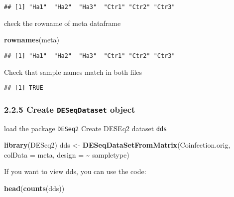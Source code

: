 \documentclass[
]{article}
\newenvironment{Shaded}{\begin{snugshade}}{\end{snugshade}}
\newcommand{\AttributeTok}[1]{\textcolor[rgb]{0.13,0.29,0.53}{#1}}
\newcommand{\FunctionTok}[1]{\textcolor[rgb]{0.13,0.29,0.53}{\textbf{#1}}}
\newcommand{\NormalTok}[1]{#1}
\newcommand{\OtherTok}[1]{\textcolor[rgb]{0.56,0.35,0.01}{#1}}
\newcommand{\SpecialCharTok}[1]{\textcolor[rgb]{0.81,0.36,0.00}{\textbf{#1}}}
\begin{document}
\begin{verbatim}
## [1] "Ha1"  "Ha2"  "Ha3"  "Ctr1" "Ctr2" "Ctr3"
\end{verbatim}

check the rowname of meta dataframe

\begin{Shaded}
\begin{Highlighting}[]
\FunctionTok{rownames}\NormalTok{(meta)}
\end{Highlighting}
\end{Shaded}

\begin{verbatim}
## [1] "Ha1"  "Ha2"  "Ha3"  "Ctr1" "Ctr2" "Ctr3"
\end{verbatim}

Check that sample names match in both files

\begin{Shaded}
\end{Shaded}

\begin{verbatim}
## [1] TRUE
\end{verbatim}

\subsubsection{\texorpdfstring{2.2.5 Create \texttt{DESeqDataset}
object}{2.2.5 Create DESeqDataset object}}\label{create-deseqdataset-object}

load the package \texttt{DESeq2} Create DESEq2 dataset \texttt{dds}

\begin{Shaded}
\begin{Highlighting}[]
\FunctionTok{library}\NormalTok{(DESeq2)}
\NormalTok{dds }\OtherTok{\textless{}{-}} \FunctionTok{DESeqDataSetFromMatrix}\NormalTok{(Coinfection.orig, }\AttributeTok{colData =}\NormalTok{ meta, }\AttributeTok{design =} \SpecialCharTok{\textasciitilde{}}\NormalTok{ sampletype)}
\end{Highlighting}
\end{Shaded}

If you want to view dds, you can use the code:

\begin{Shaded}
\begin{Highlighting}[]
\FunctionTok{head}\NormalTok{(}\FunctionTok{counts}\NormalTok{(dds))}
\end{Highlighting}
\end{Shaded}
\end{document}
